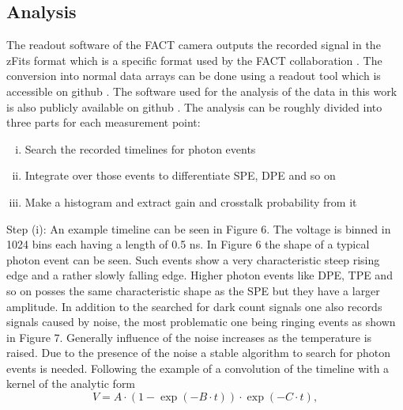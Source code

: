 \documentclass[10pt,a4paper]{article}
\begin{document}
\begin{multicols}{2}
\section{Analysis}
The readout software of the FACT camera outputs the recorded signal in the zFits format which is a specific format used by the FACT collaboration \cite{zfitspaper}. The conversion into normal data arrays can be done using a readout tool which is accessible on github \cite{zFits}. The software used for the analysis of the data in this work is also publicly available on github \cite{software}. The analysis can be roughly divided into three parts for each measurement point: 
\begin{enumerate}[(i)]
\item Search the recorded timelines for photon events 
\item Integrate over those events to differentiate SPE, DPE and so on
\item Make a histogram and extract gain and crosstalk probability from it
\end{enumerate}
Step (i): An example timeline can be seen in Figure 6. The voltage is binned in 1024 bins each having a length of 0.5 ns. In Figure 6 the shape of a typical photon event can be seen. Such events show a very characteristic steep rising edge and a rather slowly falling edge. Higher photon events like DPE, TPE and so on posses the same characteristic shape as the SPE but they have a larger amplitude. In addition to the searched for dark count signals one also records signals caused by noise, the most problematic one being ringing events as shown in Figure 7. Generally influence of the noise increases as the temperature is raised. Due to the presence of the noise a stable algorithm to search for photon events is needed. Following the example of \cite{singlephoton} a convolution of the timeline with a kernel of the analytic form 
\begin{equation}
V=A \cdot (1- \exp{(-B \cdot t)}) \cdot \exp{(-C \cdot t)},
\end{equation}

\end{multicols}
\end{document}
